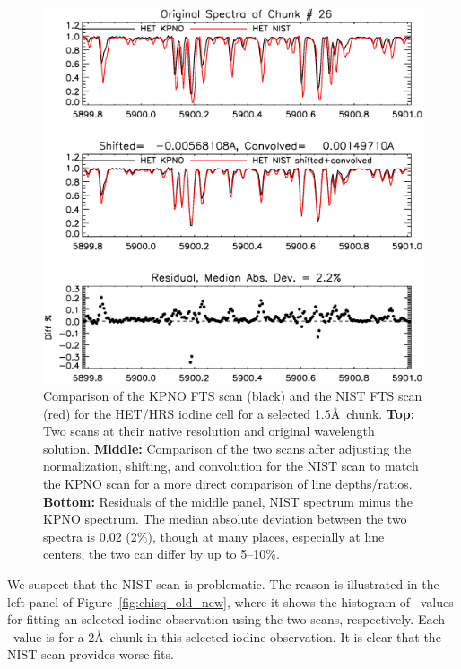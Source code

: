     
\begin{figure}[!th]
\includegraphics[angle=0.,scale=0.35]{het/compare_het_fts_26.eps}
\caption{Comparison of the KPNO FTS scan (black) and the NIST FTS scan
  (red) for the HET/HRS iodine cell for a selected
  1.5\AA\ chunk. \textbf{Top:} Two scans at their native resolution
  and original wavelength solution. \textbf{Middle:} Comparison of the
  two scans after adjusting the normalization, shifting, and
  convolution for the NIST scan to match the KPNO scan for a more
  direct comparison of line depths/ratios. \textbf{Bottom:} Residuals
  of the middle panel, NIST spectrum minus the KPNO spectrum. The
  median absolute deviation between the two spectra is 0.02
  (2\%), though at many places, especially at line centers, the two
  can differ by up to 5--10\%.
  \label{fig:fts_old_new}}
\end{figure}

We suspect that the NIST scan is problematic. The reason is
illustrated in the left panel of Figure~\ref{fig:chisq_old_new}, where
it shows the histogram of \chisq\ values for fitting an selected iodine
observation using the two scans, respectively. Each \chisq\ value is
for a 2\AA\ chunk in this selected iodine observation. It is clear
that the NIST scan provides worse fits.


